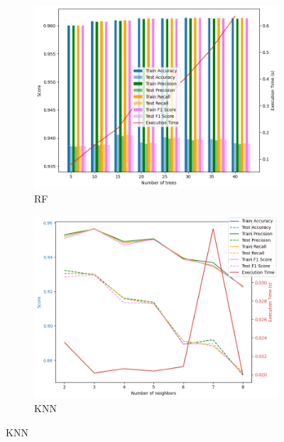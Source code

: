 \documentclass[conference]{IEEEtran}
\begin{document}
\begin{figure}[!t]
    \centering
    \begin{subfigure}[b]{0.49\columnwidth}
        \includegraphics[width=\textwidth]{rf_n_estimators.png}
        \caption{RF}\label{fig:rf}
    \end{subfigure}
    \hfill
    \begin{subfigure}[b]{0.49\columnwidth}
        \includegraphics[width=\textwidth]{knn_n_neighbors.png}
        \caption{KNN}\label{fig:knn}
    \end{subfigure}
    \vspace{-3mm}
    

\end{figure}
\end{document}
